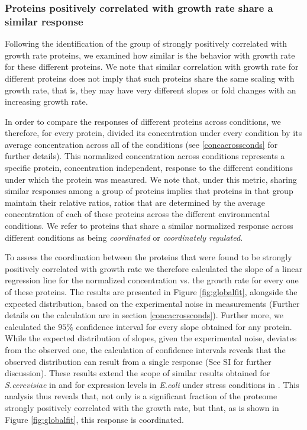 \documentclass[notitlepage]{article}
\begin{document}
\subsubsection{Proteins positively correlated with growth rate share a similar response}
\label{propchange}
Following the identification of the group of strongly positively correlated with growth rate proteins, we examined how similar is the behavior with growth rate for these different proteins.
We note that similar correlation with growth rate for different proteins does not imply that such proteins share the same scaling with growth rate, that is,  they may have very different slopes or fold changes with an increasing growth rate.

In order to compare the responses of different proteins across conditions, we therefore, for every protein,  divided its concentration under every condition by its average concentration across all of the conditions (see \ref{concacrossconds} for further details).
This normalized concentration across conditions represents a specific protein, concentration independent, response to the different conditions under which the protein was measured.
We note that, under this metric, sharing similar responses among a group of proteins implies that proteins in that group maintain their relative ratios, ratios that are determined by the average concentration of each of these proteins across the different environmental conditions.
We refer to proteins that share a similar normalized response across different conditions as being \emph{coordinated} or \emph{coordinately regulated}.

To assess the coordination between the proteins that were found to be strongly positively correlated with growth rate we therefore calculated the slope of a linear regression line for the normalized concentration vs. the growth rate for every one of these proteins.
The results are presented in Figure \ref{fig:globalfit}, alongside the expected distribution, based on the experimental noise in measurements (Further details on the calculation are in section \ref{concacrossconds}).
Further more, we calculated the $95\%$ confidence interval for every slope obtained for any protein.
While the expected distribution of slopes, given the experimental noise, deviates from the observed one, the calculation of confidence intervals reveals that the observed distribution can result from a single response (See SI for further discussion).
These results extend the scope of similar results obtained for \emph{S.cerevisiae} in \cite{Keren2013a} and for expression levels in \emph{E.coli} under stress conditions in \cite{Kaneko2014}.
This analysis thus reveals that, not only is a significant fraction of the proteome strongly positively correlated with the growth rate, but that, as is shown in Figure \ref{fig:globalfit}, this response is coordinated.
\end{document}
